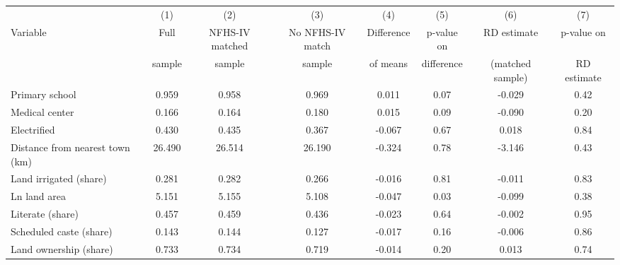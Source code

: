 \setlength{\linewidth}{.1cm} \begin{center} 
{\begin{tabular}{l c c c c c c c}
\hline\hline 
& \multicolumn{1}{c}{(1)} & \multicolumn{1}{c}{(2)} & \multicolumn{1}{c}{(3)} & \multicolumn{1}{c}{(4)} &
\multicolumn{1}{c}{(5)} & \multicolumn{1}{c}{(6)} & \multicolumn{1}{c}{(7)} \\
Variable  & Full    & NFHS-IV matched    & No NFHS-IV match    & Difference    & p-value on & RD estimate  & p-value on \\ 
          & sample  & sample    & sample      & of means     & difference    & (matched sample)  & RD estimate \\ 
\hline                                                               
Primary school                     & 0.959           & 0.958           & 0.969           & 0.011                      & 0.07    & -0.029   & 0.42    \\
Medical center                     & 0.166               & 0.164               & 0.180               & 0.015                             & 0.09 & -0.090 & 0.20               \\
Electrified                        & 0.430                    & 0.435                    & 0.367                    & -0.067                                      & 0.67 & 0.018 & 0.84               \\
Distance from nearest town (km)    & 26.490                    & 26.514                    & 26.190                    & -0.324                                     & 0.78     & -3.146 & 0.43               \\
Land irrigated (share)             & 0.281                & 0.282                & 0.266                & -0.016                               & 0.81 & -0.011 & 0.83                \\
Ln land area                       & 5.151                  & 5.155                  & 5.108                  & -0.047                                   & 0.03 & -0.099 & 0.38                  \\
Literate (share)                   & 0.457           & 0.459           & 0.436           & -0.023           & 0.64 & -0.002 & 0.95          \\
Scheduled caste (share)            & 0.143            & 0.144            & 0.127            & -0.017              & 0.16 & -0.006 & 0.86            \\
Land ownership (share)             & 0.733         & 0.734         & 0.719         & -0.014          & 0.20   & 0.013 & 0.74     \\

\end{tabular}}
\end{center}
